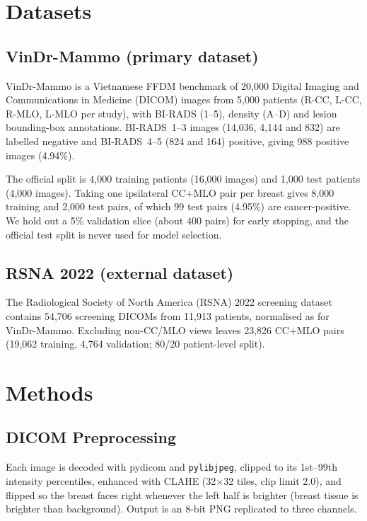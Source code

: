 \documentclass[conference]{IEEEtran}
\newcommand{\vindr}{VinDr-Mammo}
\newcommand{\rsna}{RSNA 2022}
\begin{document}
\section{Datasets}

\subsection{\vindr{} (primary dataset)}

\vindr{} \cite{1} is a Vietnamese FFDM benchmark of 20,000 Digital Imaging and Communications in Medicine (DICOM) images from 5,000 patients (R-CC, L-CC, R-MLO, L-MLO per study), with BI-RADS (1--5), density (A--D) and lesion bounding-box annotations. BI-RADS~1--3 images (14,036, 4,144 and 832) are labelled negative and BI-RADS~4--5 (824 and 164) positive, giving 988 positive images (4.94\%).

The official split is 4,000 training patients (16,000 images) and 1,000 test patients (4,000 images). Taking one ipsilateral CC+MLO pair per breast gives 8,000 training and 2,000 test pairs, of which 99 test pairs (4.95\%) are cancer-positive. We hold out a 5\% validation slice (about 400 pairs) for early stopping, and the official test split is never used for model selection.

\subsection{\rsna{} (external dataset)}

The Radiological Society of North America (RSNA) 2022 screening dataset contains 54,706 screening DICOMs from 11,913 patients, normalised as for \vindr{}. Excluding non-CC/MLO views leaves 23,826 CC+MLO pairs (19,062 training, 4,764 validation; 80/20 patient-level split).

\section{Methods}

\subsection{DICOM Preprocessing}

Each image is decoded with pydicom and \texttt{pylibjpeg}, clipped to its 1st--99th intensity percentiles, enhanced with CLAHE \cite{14} (32$\times$32 tiles, clip limit 2.0), and flipped so the breast faces right whenever the left half is brighter (breast tissue is brighter than background). Output is an 8-bit PNG replicated to three channels.
\end{document}
